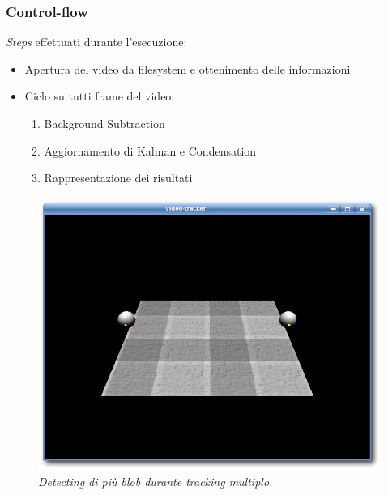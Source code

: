 \documentclass{beamer}
\begin{document}
\begin{frame}[fragile]
\frametitle{Control-flow}

\textit{Steps} effettuati durante l'esecuzione:

\begin{itemize}
\item Apertura del video da filesystem e ottenimento delle informazioni
\item Ciclo su tutti frame del video:
	\begin{enumerate}
	\item Background Subtraction
	\item Aggiornamento di Kalman e Condensation
	\item Rappresentazione dei risultati 
	\end{enumerate}
\end{itemize}

\begin{figure}[hb]
\centering
	\includegraphics[scale=0.2]{../relazione/figure/doppiascelta.jpg}
\caption[Esempio di scelta tra due blob]{\textit{Detecting di più blob durante tracking multiplo.}\label{fig:scelta2blob}}
\end{figure}





\end{frame}
\end{document}

